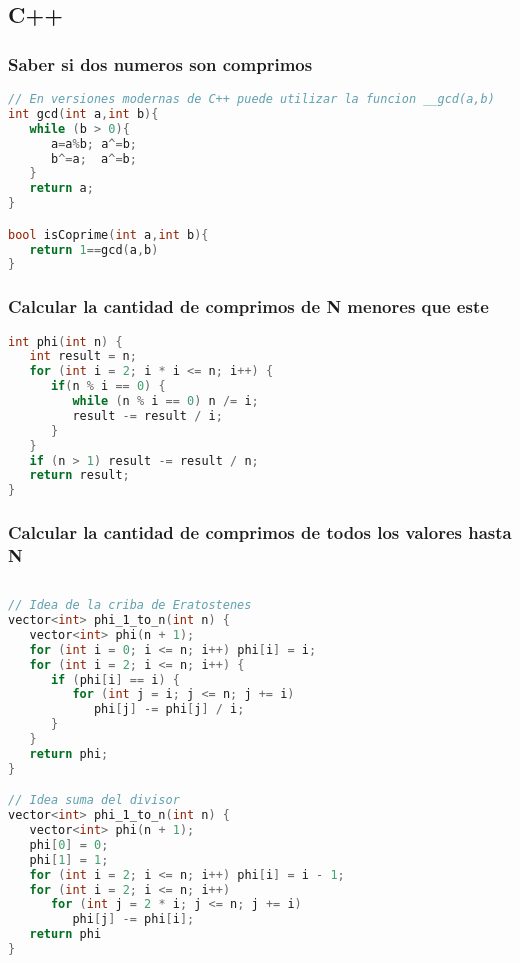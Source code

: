 \subsection{C++}

\subsubsection{Saber si dos numeros son comprimos}
\begin{lstlisting}[language=C++]
// En versiones modernas de C++ puede utilizar la funcion __gcd(a,b)
int gcd(int a,int b){
   while (b > 0){
      a=a%b; a^=b; 
      b^=a;  a^=b; 
   } 
   return a;
}

bool isCoprime(int a,int b){
   return 1==gcd(a,b)
}
\end{lstlisting}

\subsubsection{Calcular la cantidad de comprimos de N menores que este}

\begin{lstlisting}[language=C++]
int phi(int n) {
   int result = n;
   for (int i = 2; i * i <= n; i++) {
      if(n % i == 0) {
         while (n % i == 0) n /= i;
         result -= result / i;
      }
   }
   if (n > 1) result -= result / n;
   return result;
}
\end{lstlisting}

\subsubsection{Calcular la cantidad de comprimos de todos los valores hasta N}

\begin{lstlisting}[language=C++]
	
// Idea de la criba de Eratostenes
vector<int> phi_1_to_n(int n) {
   vector<int> phi(n + 1);
   for (int i = 0; i <= n; i++) phi[i] = i;
   for (int i = 2; i <= n; i++) {
      if (phi[i] == i) {
         for (int j = i; j <= n; j += i)
            phi[j] -= phi[j] / i;
      }
   }
   return phi;
}

// Idea suma del divisor
vector<int> phi_1_to_n(int n) {
   vector<int> phi(n + 1);
   phi[0] = 0;
   phi[1] = 1;
   for (int i = 2; i <= n; i++) phi[i] = i - 1;
   for (int i = 2; i <= n; i++)
      for (int j = 2 * i; j <= n; j += i)
         phi[j] -= phi[i];
   return phi
}
\end{lstlisting}

